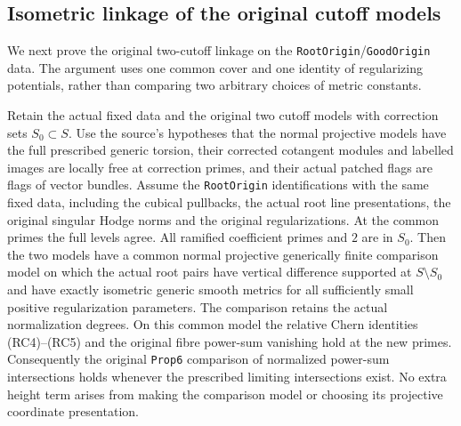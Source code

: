 \subsection{Isometric linkage of the original cutoff models}
\label{sec:geometry-original-metric-link}

We next prove the original two-cutoff linkage on the
\texttt{RootOrigin}/\texttt{GoodOrigin} data. The argument
uses one common cover and one identity of regularizing
potentials, rather than comparing two arbitrary choices
of metric constants.

\begin{theorem}
\label{thm:geometry-original-metric-link}
Retain the actual fixed data and the original two cutoff
models with correction sets \(S_0\subset S\).
Use the source's hypotheses that the normal projective
models have the full prescribed generic torsion, their
corrected cotangent modules and labelled images are
locally free at correction primes, and their actual
patched flags are flags of vector bundles. Assume the
\texttt{RootOrigin} identifications with the same fixed
data, including the cubical pullbacks, the actual root
line presentations, the original singular Hodge norms
and the original regularizations. At the common primes
the full levels agree. All ramified coefficient primes
and \(2\) are in \(S_0\).
Then the two models have a common normal projective
generically finite comparison model on which the actual
root pairs have vertical difference supported at \(S\setminus S_0\)
and have exactly isometric generic smooth metrics for
all sufficiently small positive regularization parameters.
The comparison retains the actual normalization degrees.
On this common model the relative Chern identities
(RC4)--(RC5) and the original fibre power-sum vanishing
hold at the new primes. Consequently the original
\texttt{Prop6} comparison of normalized power-sum intersections
holds whenever the prescribed limiting intersections exist.
No extra height term arises from making the comparison model
or choosing its projective coordinate presentation.
\end{theorem}

